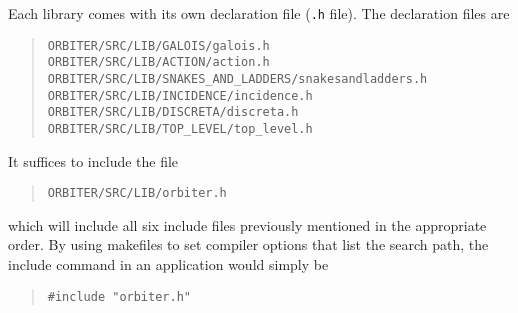 Each library comes with its own declaration file (\verb'.h' file). The declaration files are 
\begin{quote}
\verb'ORBITER/SRC/LIB/GALOIS/galois.h'\\
\verb'ORBITER/SRC/LIB/ACTION/action.h'\\
\verb'ORBITER/SRC/LIB/SNAKES_AND_LADDERS/snakesandladders.h'\\
\verb'ORBITER/SRC/LIB/INCIDENCE/incidence.h'\\
\verb'ORBITER/SRC/LIB/DISCRETA/discreta.h'\\
\verb'ORBITER/SRC/LIB/TOP_LEVEL/top_level.h'\\
\end{quote}
It suffices to include the file
\begin{quote}
\verb'ORBITER/SRC/LIB/orbiter.h'
\end{quote}
which will include all six include files previously mentioned in the appropriate order.
By using makefiles to set compiler options that list the search path, 
the include command in an application would simply be 
\begin{quote}
\verb'#include "orbiter.h"'
\end{quote}


\bigskip



\bigskip









